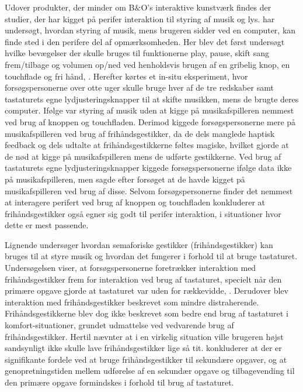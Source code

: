 Udover produkter, der minder om B$\&$O's interaktive kunstværk findes der studier, der har kigget på perifer interaktion til styring af musik og lys. \textcite[s. 162]{PDF:ComparingInputModalities} har undersøgt, hvordan styring af musik, mens brugeren sidder ved en computer, kan finde sted i den perifere del af opmærksomheden. Her blev det først undersøgt hvilke bevægelser der skulle bruges til funktionerne play, pause, skift sang frem/tilbage og volumen op/ned ved henholdsvis brugen af en gribelig knop, en touchflade og fri hånd, \parencite[ss. 165-166]{PDF:ComparingInputModalities}. Herefter kørtes et in-situ eksperiment, hvor forsøgspersonerne over otte uger skulle bruge hver af de tre redskaber samt tastaturets egne lydjusteringsknapper til at skifte musikken, mens de brugte deres computer. Ifølge \textcite[ss. 172-173]{PDF:ComparingInputModalities} var styring af musik uden at kigge på musikafspilleren nemmest ved brug af knoppen og touchfladen. Derimod kiggede forsøgspersonerne mere på musikafspilleren ved brug af frihåndsgestikker, da de dels manglede haptisk feedback og dels udtalte at frihåndsgestikkerne føltes magiske, hvilket gjorde at de nød at kigge på musikafspilleren mens de udførte gestikkerne. Ved brug af tastaturets egne lydjusteringsknapper kiggede forsøgspersonerne ifølge data ikke på musikafspilleren, men sagde efter forsøget at de havde kigget på musikafspilleren ved brug af disse. Selvom forsøgspersonerne finder det nemmest at interagere perifert ved brug af knoppen og touchfladen konkluderer \textcite[s. 177]{PDF:ComparingInputModalities} at frihåndsgestikker også egner sig godt til perifer interaktion, i situationer hvor dette er mest passende.

Lignende \textcite{PDF:ComparingInputModalities} undersøger \textcite{PDF:AStudyOnTheUseOfSemaphoricGestures} hvordan semaforiske gestikker (frihåndsgestikker) kan bruges til at styre musik og hvordan det fungerer i forhold til at bruge tastaturet. Undersøgelsen viser, at forsøgspersonerne foretrækker interaktion med frihåndsgestikker frem for interaktion ved brug af tastaturet, specielt når den primære opgave gjorde at tastaturet var uden for rækkevidde, \parencite[s. 1963]{PDF:AStudyOnTheUseOfSemaphoricGestures}. Derudover blev interaktion med frihåndsgestikker beskrevet som mindre distraherende. Frihåndsgestikkerne blev dog ikke beskrevet som bedre end brug af tastaturet i komfort-situationer, grundet udmattelse ved vedvarende brug af frihåndsgestikker. Hertil nævnter \textcite[s. 1963]{PDF:AStudyOnTheUseOfSemaphoricGestures} at i en virkelig situation ville brugeren højst sandsynligt ikke skulle lave frihåndsgestikker lige så tit. \textcite[s. 1964]{PDF:AStudyOnTheUseOfSemaphoricGestures} konkluderer at der er signifikante fordele ved at bruge frihåndsgestikker til sekundære opgaver, og at genopretningstiden mellem udførelse af en sekundær opgave og tilbagevending til den primære opgave formindskes i forhold til brug af tastaturet.


